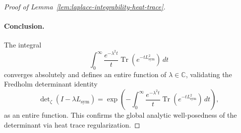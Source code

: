 \begin{proof}[Proof of Lemma~\ref{lem:laplace-integrability-heat-trace}]
\paragraph{Conclusion.}
The integral
\[
\int_0^\infty \frac{e^{-\lambda^2 t}}{t} \operatorname{Tr}(e^{-t L_{\mathrm{sym}}^2}) \, dt
\]
converges absolutely and defines an entire function of \( \lambda \in \mathbb{C} \), validating the Fredholm determinant identity
\[
\det\nolimits_\zeta(I - \lambda L_{\mathrm{sym}}) = \exp\left( -\int_0^\infty \frac{e^{-\lambda^2 t}}{t} \operatorname{Tr}(e^{-t L_{\mathrm{sym}}^2})\, dt \right),
\]
as an entire function. This confirms the global analytic well-posedness of the determinant via heat trace regularization.
\end{proof}
